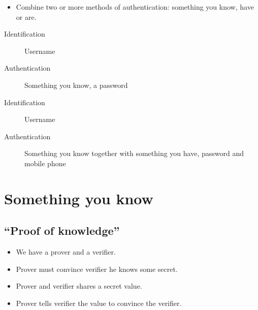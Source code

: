 \begin{frame}
  \begin{definition}
    \begin{itemize}
      \item Combine two or more methods of authentication: something you know, 
        have or are.
    \end{itemize}
  \end{definition}
\end{frame}

\begin{frame}
  \begin{example}
    \begin{description}
      \item[Identification] Username
      \item[Authentication] Something you know, \ie a password
    \end{description}
  \end{example}

  \pause{}

  \begin{example}
    \begin{description}
      \item[Identification] Username
      \item[Authentication] Something you know together with something you 
        have, \eg password and mobile phone
    \end{description}
  \end{example}
\end{frame}


\section{Something you know}

\subsection{\enquote{Proof of knowledge}}

\begin{frame}
  \begin{idea}
    \begin{itemize}
      \item We have a prover and a verifier.
      \item Prover must convince verifier he knows some secret.
    \end{itemize}
  \end{idea}

  \begin{idea}[Password]
    \begin{itemize}
      \item Prover and verifier shares a secret value.
      \item Prover tells verifier the value to convince the verifier.
    \end{itemize}
  \end{idea}
\end{frame}

